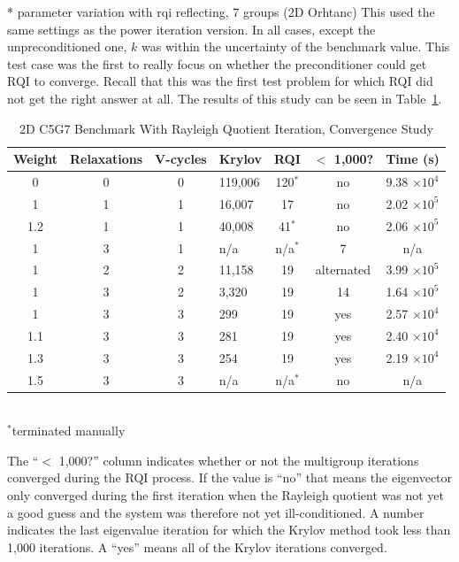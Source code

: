 * parameter variation with rqi reflecting, 7 groups (2D Orhtanc)
This used the same settings as the power iteration version. In all cases, except the unpreconditioned one, $k$ was within the uncertainty of the benchmark value. This test case was the first to really focus on whether the preconditioner could get RQI to converge. Recall that this was the first test problem for which RQI did not get the right answer at all. The results of this study can be seen in Table~\ref{table:2D c5g7 rqi}.
%
\begin{table}[!h]
\caption{2D C5G7 Benchmark With Rayleigh Quotient Iteration, Convergence Study}
\begin{center}
\begin{tabular}{c c c l c c c}
\hline
Weight & Relaxations & V-cycles & Krylov & RQI & $<$ 1,000? & Time (s) \\[0.5ex]
\hline
0    & 0 & 0 & 119,006 & 120$^{*}$ & no &9.38 $\times 10^{4}$ \\
1    & 1 & 1 & 16,007   & 17            & no & 2.02 $\times 10^{5}$ \\
1.2 & 1 & 1 & 40,008   & 41$^{*}$   & no & 2.06 $\times 10^{5}$ \\
1    & 3 & 1 & n/a         & n/a$^{*}$  & 7   & n/a \\
1    & 2 & 2 & 11,158   & 19            & alternated & 3.99 $\times 10^{5}$ \\
1    & 3 & 2 & 3,320     & 19            & 14 & 1.64 $\times 10^{5}$ \\
\hline
1    & 3 & 3 & 299        & 19            & yes & 2.57 $\times 10^{4}$ \\
1.1 & 3 & 3 & 281        & 19            & yes & 2.40 $\times 10^{4}$ \\
1.3 & 3 & 3 & 254        & 19            & yes & 2.19 $\times 10^{4}$ \\
1.5 & 3 & 3 & n/a         & n/a$^{*}$ & no & n/a \\
\hline 
\end{tabular} \\
$^{*}$terminated manually
\end{center}
\label{table:2D c5g7 rqi}
\end{table}

The ``$<$ 1,000?'' column indicates whether or not the multigroup iterations converged during the RQI process. If the value is ``no'' that means the eigenvector only converged during the first iteration when the Rayleigh quotient was not yet a good guess and the system was therefore not yet ill-conditioned. A number indicates the last eigenvalue iteration for which the Krylov method took less than 1,000 iterations. A ``yes'' means all of the Krylov iterations converged.

